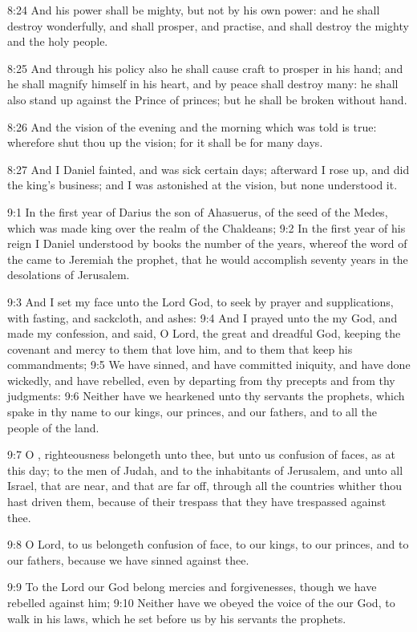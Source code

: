 8:24 And his power shall be mighty, but not by his own power: and he shall destroy wonderfully, and shall prosper, and practise, and shall destroy the mighty and the holy people.

8:25 And through his policy also he shall cause craft to prosper in his hand; and he shall magnify himself in his heart, and by peace shall destroy many: he shall also stand up against the Prince of princes; but he shall be broken without hand.

8:26 And the vision of the evening and the morning which was told is true: wherefore shut thou up the vision; for it shall be for many days.

8:27 And I Daniel fainted, and was sick certain days; afterward I rose up, and did the king's business; and I was astonished at the vision, but none understood it.

9:1 In the first year of Darius the son of Ahasuerus, of the seed of the Medes, which was made king over the realm of the Chaldeans; 9:2 In the first year of his reign I Daniel understood by books the number of the years, whereof the word of the \LORD came to Jeremiah the prophet, that he would accomplish seventy years in the desolations of Jerusalem.

9:3 And I set my face unto the Lord God, to seek by prayer and supplications, with fasting, and sackcloth, and ashes: 9:4 And I prayed unto the \LORD my God, and made my confession, and said, O Lord, the great and dreadful God, keeping the covenant and mercy to them that love him, and to them that keep his commandments; 9:5 We have sinned, and have committed iniquity, and have done wickedly, and have rebelled, even by departing from thy precepts and from thy judgments: 9:6 Neither have we hearkened unto thy servants the prophets, which spake in thy name to our kings, our princes, and our fathers, and to all the people of the land.

9:7 O \LORD, righteousness belongeth unto thee, but unto us confusion of faces, as at this day; to the men of Judah, and to the inhabitants of Jerusalem, and unto all Israel, that are near, and that are far off, through all the countries whither thou hast driven them, because of their trespass that they have trespassed against thee.

9:8 O Lord, to us belongeth confusion of face, to our kings, to our princes, and to our fathers, because we have sinned against thee.

9:9 To the Lord our God belong mercies and forgivenesses, though we have rebelled against him; 9:10 Neither have we obeyed the voice of the \LORD our God, to walk in his laws, which he set before us by his servants the prophets.

